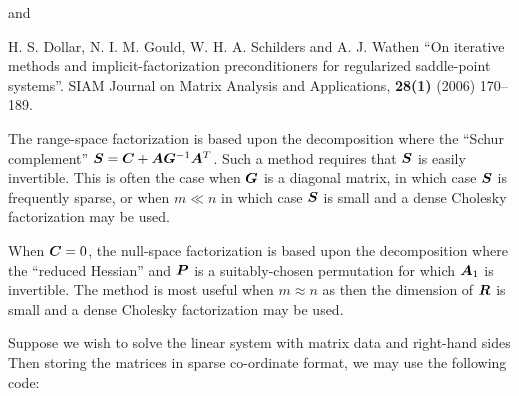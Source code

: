 \documentclass{galahad}
\begin{document}
\noindent
and

\noindent
H. S. Dollar, N. I. M. Gould, W. H. A. Schilders and A. J. Wathen
``On iterative methods and implicit-factorization preconditioners for
regularized saddle-point systems''.
SIAM Journal on Matrix Analysis and Applications, {\bf 28(1)} (2006) 170--189.
\vspace*{1mm}

\noindent
The range-space factorization is based upon the decomposition
where the ``Schur complement'' ${\bm{S}} = {\bm{C}} + {\bm{A}} {\bm{G}}^{-1} {\bm{A}}^T$.
Such a method requires that ${\bm{S}}$ is easily invertible. This is often the
case when ${\bm{G}}$ is a diagonal matrix, in which case ${\bm{S}}$ is frequently
sparse, or when $m \ll n$ in which case ${\bm{S}}$
is small and a dense Cholesky factorization may be used.
\vspace*{1mm}

\noindent
When ${\bm{C}} = 0$, the null-space factorization is based upon the decomposition
where the ``reduced Hessian''
and ${\bm{P}}$ is a suitably-chosen permutation for which ${\bm{A}}_1$ is invertible.
The method is most useful when $m \approx n$ as then the dimension
of ${\bm{R}}$ is small and a dense Cholesky factorization may be used.



\galexample
Suppose we wish to solve the linear system  with matrix data
and right-hand sides
Then storing the matrices in sparse co-ordinate format,
we may use the following code:
\end{document}
